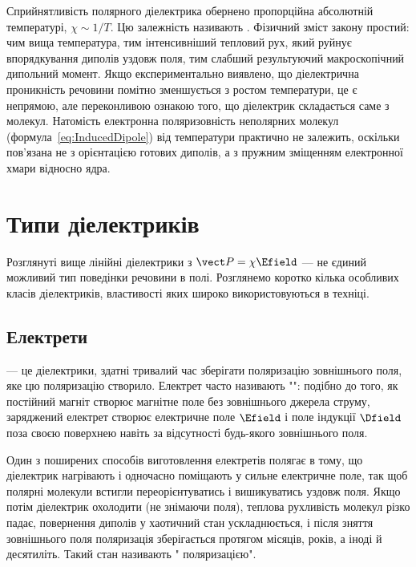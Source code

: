 \begin{Attention}
	Сприйнятливість полярного діелектрика обернено пропорційна абсолютній температурі, $\chi \sim 1/T$. Цю залежність називають . Фізичний зміст закону простий: чим вища температура, тим інтенсивніший тепловий рух, який руйнує впорядкування диполів уздовж поля,
	тим слабший результуючий макроскопічний дипольний момент. Якщо експериментально виявлено, що діелектрична проникність речовини помітно
	зменшується з ростом температури, це є непрямою, але переконливою ознакою того, що діелектрик складається саме з  молекул.
	Натомість електронна поляризовність неполярних молекул (формула~\eqref{eq:InducedDipole}) від температури практично не залежить, оскільки
	пов'язана не з орієнтацією готових диполів, а з пружним зміщенням електронної хмари відносно ядра.
\end{Attention}

\section{Типи діелектриків}

Розглянуті вище лінійні діелектрики з $\vect P = \chi\Efield$ --- не єдиний можливий тип поведінки речовини в полі. Розглянемо коротко кілька
особливих класів діелектриків, властивості яких широко використовуються в техніці.

\subsection*{Електрети}

 --- це діелектрики, здатні тривалий час зберігати поляризацію  зовнішнього поля, яке цю поляризацію створило.
Електрет часто називають "": подібно до того, як постійний магніт створює магнітне поле без
зовнішнього джерела струму, заряджений електрет створює електричне поле $\Efield$ і поле індукції $\Dfield$ поза своєю поверхнею навіть за
відсутності будь-якого зовнішнього поля.

Один з поширених способів виготовлення електретів полягає в тому, що діелектрик нагрівають і одночасно поміщають у сильне електричне поле, так щоб
полярні молекули встигли переорієнтуватись і вишикуватись уздовж поля. Якщо потім діелектрик охолодити (не знімаючи поля), теплова рухливість
молекул різко падає, повернення диполів у хаотичний стан ускладнюється, і після зняття зовнішнього поля поляризація зберігається протягом місяців,
років, а іноді й десятиліть. Такий стан називають " поляризацією".

